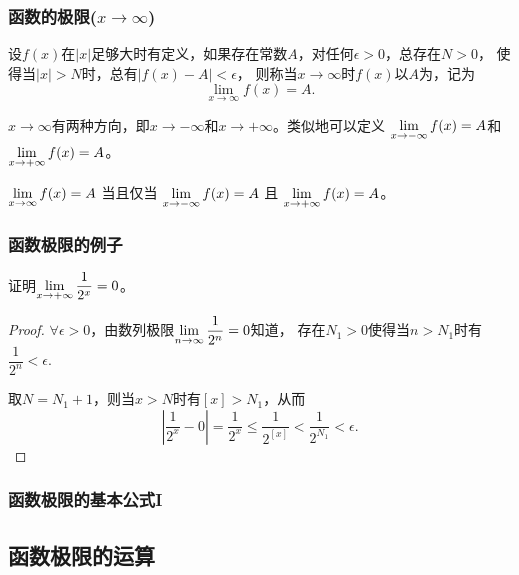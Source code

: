 \documentclass[14pt,notheorems,leqno,xcolor={rgb}]{beamer} %
\begin{document}
\begin{iframe}
\frametitle{函数的极限($x\to\infty$)}
\begin{definition}
设$f(x)$在$|x|$足够大时有定义，如果存在常数$A$，对任何$\epsilon>0$，总存在$N>0$，
使得当$|x|>N$时，总有$|f(x)-A|<\epsilon$，
则称当$x\to\infty$时$f(x)$以$A$为，记为
\[ \lim_{x\to\infty}f(x)=A. \]
\end{definition}
\vpause
\begin{remark*}
$x\to\infty$有两种方向，即$x\to-\infty$和$x\to+\infty$。类似地可以定义
$\lim\limits_{x\to-\infty}f(x)=A$和$\lim\limits_{x\to+\infty}f(x)=A$。
\end{remark*}
\vpause
\begin{property*}
$\lim\limits_{x\to\infty}f(x)=A$ 当且仅当 $\lim\limits_{x\to-\infty}f(x)=A$ 且 $\lim\limits_{x\to+\infty}f(x)=A$。
\end{property*}
\end{iframe}

\begin{jframe}
\frametitle{函数极限的例子}
\begin{example*}
证明$\lim\limits_{x\to+\infty}\dfrac1{2^x}= 0$。
\end{example*}
\begin{proof}
$\forall\epsilon>0$，由数列极限$\lim\limits_{n\to\infty}\dfrac1{2^n}= 0$知道，
存在$N_1>0$使得当$n>N_1$时有$\dfrac1{2^n}<\epsilon$.
\par
取$N=N_1+1$，则当$x>N$时有$[x]>N_1$，从而
$$\left|\frac1{2^x}-0\right|=\frac1{2^x}\le\frac1{2^{[x]}}<\frac1{2^{N_1}}<\epsilon.$$
\end{proof}
\end{jframe}

\begin{frame}
\frametitle{函数极限的基本公式I}
\noindent{}
\end{frame}

\subsection{函数极限的运算}
\end{document}
